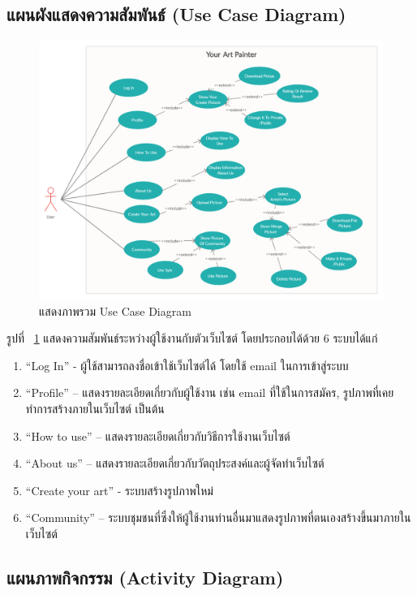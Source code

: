 \documentclass[12pt,oneside,openright,a4paper]{cpe-thai-project}
\begin{document}
\newpage
\subsection{แผนผังแสดงความสัมพันธ์ (Use Case Diagram)}

\begin{figure}[!h]
  \centering
  \includegraphics[width=15cm]{./image/use-case.png}
  \caption{แสดงภาพรวม Use Case Diagram}
  \label{fig:usecase}
\end{figure}

รูปที่ ~\ref{fig:usecase} แสดงความสัมพันธ์ระหว่างผู้ใช้งานกับตัวเว็บไซต์ โดยประกอบได้ด้วย 6 ระบบได้แก่


\begin{enumerate}
  \item “Log In” - ผู้ใช้สามารถลงชื่อเข้าใช้เว็บไซต์ได้ โดยใช้ email ในการเข้าสู่ระบบ
  \item “Profile” – แสดงรายละเอียดเกี่ยวกับผู้ใช้งาน เช่น email ที่ใช้ในการสมัคร, รูปภาพที่เคยทำการสร้างภายในเว็บไซต์ เป็นต้น
  \item “How to use” – แสดงรายละเอียดเกี่ยวกับวิธีการใช้งานเว็บไซต์
  \item “About us” – แสดงรายละเอียดเกี่ยวกับวัตถุประสงค์และผู้จัดทำเว็บไซต์ 
  \item “Create your art” - ระบบสร้างรูปภาพใหม่
  \item “Community” – ระบบชุมชนที่ซึ่งให้ผู้ใช้งานท่านอื่นมาแสดงรูปภาพที่ตนเองสร้างขึ้นมาภายในเว็บไซต์
\end{enumerate}

\newpage
\subsection{แผนภาพกิจกรรม (Activity Diagram)}
\end{document}
